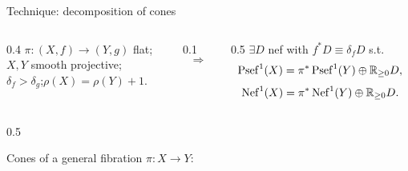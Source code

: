 \documentclass[12pt,aspectratio=1610]{ecnubeamerformyself}
\begin{document}
\begin{frame}{Technique: decomposition of cones}

    \vspace{0.5em}

    \begin{theorem}\label{thm: cone-decomp}
        \vspace{0.5em}
        \begin{columns}[c]
            \begin{column}{0.4\textwidth}
                \centering
                \(\pi:(X,f) \to (Y,g)\) flat; \\
                \(X,Y\) smooth projective; \\
                \(\delta_f > \delta_g\);\(\rho(X) = \rho(Y)+1\).
            \end{column}

            \begin{column}{0.1\textwidth}
                \centering
                \[ \Longrightarrow \]
            \end{column}

            \begin{column}{0.5\textwidth}
                \centering
                \(\exists D\) nef with \(f^*D \equiv \delta_f D\) s.t.
                \[ \mathop{\mathrm{Psef}}\nolimits^1(X) = \pi^*\mathop{\mathrm{Psef}}\nolimits^1(Y) \oplus {\mathbb{R}}_{\geq 0} D,\] 
                \[ \mathop{\mathrm{Nef}}\nolimits^1(X) = \pi^*\mathop{\mathrm{Nef}}\nolimits^1(Y) \oplus {\mathbb{R}}_{\geq 0} D. \]
            \end{column}
        \end{columns}
    \end{theorem}

    \pause

    \begin{columns}[c]  
        \begin{column}{0.5\textwidth}
            \centering

            Cones of a general fibration \(\pi:X\to Y\):

            \vspace{1em}
            
\end{column}
\end{columns}
\end{frame}
\end{document}

